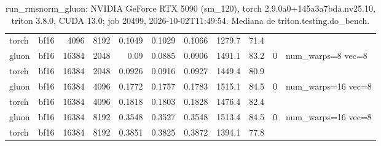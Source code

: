 \begin{table}[htbp]
\begin{tabular}{llrrrrrrrll}
    torch & bf16 & 4096 & 8192 & 0.1049 & 0.1029 & 0.1066 & 1279.7 & 71.4 &  &  \\
    gluon & bf16 & 16384 & 2048 & 0.09 & 0.0885 & 0.0906 & 1491.1 & 83.2 & 0 & num\_warps=8 vec=8 \\
    torch & bf16 & 16384 & 2048 & 0.0926 & 0.0916 & 0.0927 & 1449.4 & 80.9 &  &  \\
    gluon & bf16 & 16384 & 4096 & 0.1772 & 0.1757 & 0.1783 & 1515.1 & 84.5 & 0 & num\_warps=16 vec=8 \\
    torch & bf16 & 16384 & 4096 & 0.1818 & 0.1803 & 0.1828 & 1476.4 & 82.4 &  &  \\
    gluon & bf16 & 16384 & 8192 & 0.3548 & 0.3527 & 0.3548 & 1513.4 & 84.5 & 0 & num\_warps=16 vec=8 \\
    torch & bf16 & 16384 & 8192 & 0.3851 & 0.3825 & 0.3872 & 1394.1 & 77.8 &  &  \\
    \bottomrule
  \end{tabular}
  \caption{run\_rmsnorm\_gluon: NVIDIA GeForce RTX 5090 (sm\_120), torch 2.9.0a0+145a3a7bda.nv25.10, triton 3.8.0, CUDA 13.0; job 20499, 2026-10-02T11:49:54. Mediana de triton.testing.do\_bench.}
  \label{tab:run-rmsnorm-gluon}
\end{table}
